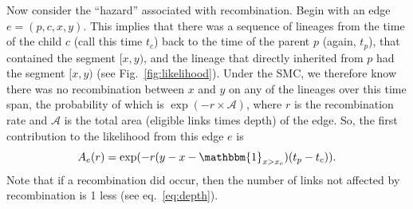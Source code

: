 \documentclass{article}
\begin{document}
Now consider the ``hazard'' associated with recombination.
Begin with an edge $e = (p,c,x,y)$.
This implies that there was a sequence of lineages
from the time of the child $c$ (call this time $t_c$)
back to the time of the parent $p$ (again, $t_p$),
that contained the segment $[x,y)$,
and the lineage that directly inherited from $p$
had the segment $[x,y)$ (see Fig.~\ref{fig:likelihood}).
Under the SMC,
we therefore know there was no recombination between $x$ and $y$
on any of the lineages 
over this time span,
the probability of which is
$\exp(-r \times \mathcal{A})$, where $r$ is the recombination rate
and $\mathcal{A}$ is the total area (eligible links times depth) of the edge.
So, the first contribution to the likelihood from this edge $e$ is
\begin{equation}\label{eq:span}
A_e(r) = \exp(-r (y-x - \mathbbm{1}_{x > x_c})(t_p - t_{c})) .
\end{equation}
Note that if a recombination did occur, then the number of links not
affected by recombination is 1 less (see eq.~\eqref{eq:depth}).
\end{document}
